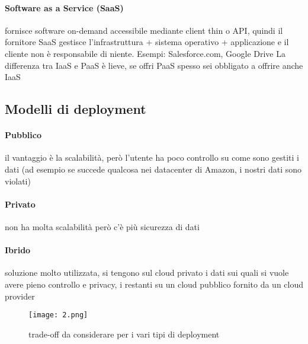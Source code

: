 \paragraph{Software as a Service (SaaS)} fornisce software on-demand accessibile mediante client thin o API, quindi il fornitore SaaS gestisce l’infrastruttura + sistema operativo + applicazione e il cliente non è responsabile di niente.  Esempi: Salesforce.com, Google Drive
La differenza tra IaaS e PaaS è lieve, se offri PaaS spesso sei obbligato a offrire anche IaaS

\newpage
\subsection{Modelli di deployment}
\paragraph{Pubblico}il vantaggio è la scalabilità, però l'utente ha poco controllo su come sono gestiti i dati (ad esempio se succede qualcosa nei datacenter di Amazon, i nostri dati sono violati)
\paragraph{Privato} non ha molta scalabilità però c'è più sicurezza di dati
\paragraph{Ibrido} soluzione molto utilizzata, si tengono sul cloud privato i dati sui quali si vuole avere pieno controllo e privacy, i restanti su un cloud pubblico fornito da un cloud provider

\begin{figure}[h!]
    \centering
    \texttt{[image: 2.png]}
    \caption{trade-off da considerare per i vari tipi di deployment}
\end{figure}

